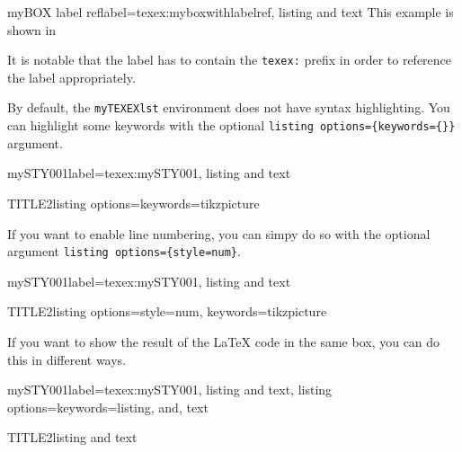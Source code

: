 \documentclass[]{myHOWTO-V001}
\begin{document}
\begin{myTEXEXdoclst}{myBOX label ref}{label={texex:myboxwithlabelref}, listing and text}
This example is shown in 
\end{myTEXEXdoclst}

It is notable that the label has to contain the \Verb|texex:| prefix in order to reference the label appropriately.

By default, the \Verb|myTEXEXlst| environment does not have syntax highlighting. You can highlight some keywords with the optional \verb|listing options={keywords={}}| argument.

\begin{myTEXEXdoclst}{mySTY001}{label={texex:mySTY001}, listing and text}
\begin{myTEXEXlst}{TITLE2}{listing options={keywords={tikzpicture}}}
\begin{figure}[H]
	\begin{tikzpicture}
	[...]
	\end{tikzpicture}
\end{figure}
\end{myTEXEXlst}
\end{myTEXEXdoclst}

If you want to enable line numbering, you can simpy do so with the optional argument \verb|listing options={style=num}|.

\begin{myTEXEXdoclst}{mySTY001}{label={texex:mySTY001}, listing and text}
\begin{myTEXEXlst}{TITLE2}{listing options={style=num, keywords={tikzpicture}}}
\begin{figure}[H]
	\begin{tikzpicture}
	[...]
	\end{tikzpicture}
\end{figure}
\end{myTEXEXlst}
\end{myTEXEXdoclst}

If you want to show the result of the \LaTeX{} code in the same box, you can do this in different ways.

\begin{myTEXEXdoclst}{mySTY001}{label={texex:mySTY001}, listing and text, listing options={keywords={listing, and, text}}}
\begin{myTEXEXlst}{TITLE2}{listing and text}
\lipsum[4]
\end{myTEXEXlst}
\end{myTEXEXdoclst}
\end{document}
